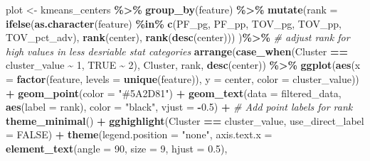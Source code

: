 \documentclass[
]{article}
\newenvironment{Shaded}{\begin{snugshade}}{\end{snugshade}}
\newcommand{\AttributeTok}[1]{\textcolor[rgb]{0.13,0.29,0.53}{#1}}
\newcommand{\CommentTok}[1]{\textcolor[rgb]{0.56,0.35,0.01}{\textit{#1}}}
\newcommand{\ConstantTok}[1]{\textcolor[rgb]{0.56,0.35,0.01}{#1}}
\newcommand{\DecValTok}[1]{\textcolor[rgb]{0.00,0.00,0.81}{#1}}
\newcommand{\FloatTok}[1]{\textcolor[rgb]{0.00,0.00,0.81}{#1}}
\newcommand{\FunctionTok}[1]{\textcolor[rgb]{0.13,0.29,0.53}{\textbf{#1}}}
\newcommand{\NormalTok}[1]{#1}
\newcommand{\OtherTok}[1]{\textcolor[rgb]{0.56,0.35,0.01}{#1}}
\newcommand{\SpecialCharTok}[1]{\textcolor[rgb]{0.81,0.36,0.00}{\textbf{#1}}}
\newcommand{\StringTok}[1]{\textcolor[rgb]{0.31,0.60,0.02}{#1}}
\begin{document}
\begin{Shaded}
\begin{Highlighting}[]
\NormalTok{  plot }\OtherTok{\textless{}{-}}\NormalTok{ kmeans\_centers }\SpecialCharTok{\%\textgreater{}\%}
    \FunctionTok{group\_by}\NormalTok{(feature) }\SpecialCharTok{\%\textgreater{}\%}
    \FunctionTok{mutate}\NormalTok{(}\AttributeTok{rank =} \FunctionTok{ifelse}\NormalTok{(}\FunctionTok{as.character}\NormalTok{(feature) }\SpecialCharTok{\%in\%} \FunctionTok{c}\NormalTok{(}\StringTok{\textquotesingle{}PF\_pg\textquotesingle{}}\NormalTok{, }\StringTok{\textquotesingle{}PF\_pp\textquotesingle{}}\NormalTok{, }\StringTok{\textquotesingle{}TOV\_pg\textquotesingle{}}\NormalTok{, }\StringTok{\textquotesingle{}TOV\_pp\textquotesingle{}}\NormalTok{, }\StringTok{\textquotesingle{}TOV\_pct\_adv\textquotesingle{}}\NormalTok{), }
                         \FunctionTok{rank}\NormalTok{(center), }
                         \FunctionTok{rank}\NormalTok{(}\FunctionTok{desc}\NormalTok{(center)))}
\NormalTok{    )}\SpecialCharTok{\%\textgreater{}\%} \CommentTok{\# adjust rank for high values in less desriable stat categories}
    \FunctionTok{arrange}\NormalTok{(}\FunctionTok{case\_when}\NormalTok{(Cluster }\SpecialCharTok{==}\NormalTok{ cluster\_value }\SpecialCharTok{\textasciitilde{}} \DecValTok{1}\NormalTok{, }\ConstantTok{TRUE} \SpecialCharTok{\textasciitilde{}} \DecValTok{2}\NormalTok{), Cluster, rank, }\FunctionTok{desc}\NormalTok{(center)) }\SpecialCharTok{\%\textgreater{}\%}
    \FunctionTok{ggplot}\NormalTok{(}\FunctionTok{aes}\NormalTok{(}\AttributeTok{x =} \FunctionTok{factor}\NormalTok{(feature, }\AttributeTok{levels =} \FunctionTok{unique}\NormalTok{(feature)), }\AttributeTok{y =}\NormalTok{ center, }\AttributeTok{color =}\NormalTok{ cluster\_value)) }\SpecialCharTok{+}
    \FunctionTok{geom\_point}\NormalTok{(}\AttributeTok{color =} \StringTok{"\#5A2D81"}\NormalTok{) }\SpecialCharTok{+}
    \FunctionTok{geom\_text}\NormalTok{(}\AttributeTok{data =}\NormalTok{ filtered\_data, }\FunctionTok{aes}\NormalTok{(}\AttributeTok{label =}\NormalTok{ rank), }\AttributeTok{color =} \StringTok{"black"}\NormalTok{, }\AttributeTok{vjust =} \SpecialCharTok{{-}}\FloatTok{0.5}\NormalTok{) }\SpecialCharTok{+}  \CommentTok{\# Add point labels for rank}
    \FunctionTok{theme\_minimal}\NormalTok{() }\SpecialCharTok{+}
    \FunctionTok{gghighlight}\NormalTok{(Cluster }\SpecialCharTok{==}\NormalTok{ cluster\_value, }\AttributeTok{use\_direct\_label =} \ConstantTok{FALSE}\NormalTok{) }\SpecialCharTok{+}
    \FunctionTok{theme}\NormalTok{(}\AttributeTok{legend.position =} \StringTok{"none"}\NormalTok{,}
          \AttributeTok{axis.text.x =} \FunctionTok{element\_text}\NormalTok{(}\AttributeTok{angle =} \DecValTok{90}\NormalTok{, }\AttributeTok{size =} \DecValTok{9}\NormalTok{, }\AttributeTok{hjust =} \FloatTok{0.5}\NormalTok{),}

\end{Highlighting}
\end{Shaded}
\end{document}
